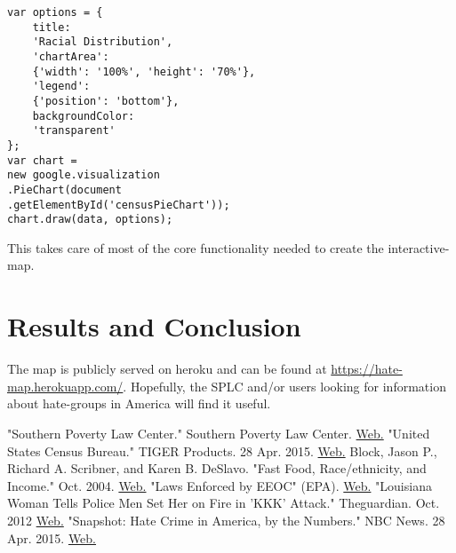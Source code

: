 \documentclass[twoside]{article}
\begin{document}
\begin{multicols}{2}
\begin{verbatim}
var options = {
    title: 
    'Racial Distribution',
    'chartArea': 
    {'width': '100%', 'height': '70%'},
    'legend': 
    {'position': 'bottom'},
    backgroundColor: 
    'transparent'
};
var chart = 
new google.visualization
.PieChart(document
.getElementById('censusPieChart'));
chart.draw(data, options);
\end{verbatim}
This takes care of most of the core functionality needed to create the interactive-map.




\section{Results and Conclusion}
The map is publicly served on heroku and can be found at \url{https://hate-map.herokuapp.com/}. Hopefully, the SPLC and/or users looking for information
about hate-groups in America will find it useful.


\begin{thebibliography}{99} %
"Southern Poverty Law Center." Southern Poverty Law Center. \href{http://www.splcenter.org/}{Web.}
 "United States Census Bureau." TIGER Products. 28 Apr. 2015. 
 \href{https://www.census.gov/geo/maps-data/data/tiger.html}{Web.}
Block, Jason P., Richard A. Scribner, and Karen B. DeSlavo. "Fast Food, Race/ethnicity, and Income."  Oct. 2004.
\href{http://www.ajpmonline.org/article/S0749-3797(04)00139-4/abstract?cc=y}{Web.}
 "Laws Enforced by EEOC" (EPA). \href{http://www.eeoc.gov/laws/statutes/}{Web.}
 "Louisiana Woman Tells Police Men Set Her on Fire in 'KKK' Attack." Theguardian. Oct. 2012 \href{http://www.theguardian.com/world/2012/oct/23/louisiana-woman-fire-kkk-attack}{Web.}
"Snapshot: Hate Crime in America, by the Numbers." NBC News. 28 Apr. 2015. \href{http://www.nbcnews.com/storyline/jewish-center-shootings/snapshot-hate-crime-america-numbers-n81521}{Web.}

\end{thebibliography}


\end{multicols}
\end{document}
